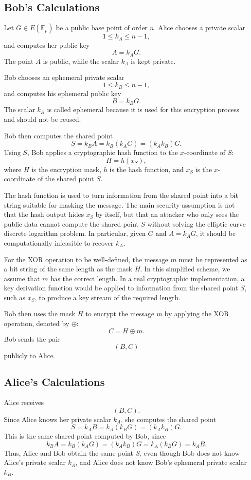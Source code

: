\documentclass[12pt,a4paper]{article}
\begin{document}
\subsection{Bob's Calculations}

Let \(G\in E(\mathbb{F}_p)\) be a public base point of order \(n\). Alice chooses a private scalar
\[1\leq k_A\leq n-1,\]
and computes her public key
\[A=k_AG.\]
The point \(A\) is public, while the scalar \(k_A\) is kept private.

Bob chooses an ephemeral private scalar
\[1\leq k_B\leq n-1,\]
and computes his ephemeral public key
\[B=k_BG.\]
The scalar \(k_B\) is called ephemeral because it is used for this encryption process and should not be reused.

Bob then computes the shared point
\[S=k_BA=k_B(k_AG)=(k_Ak_B)G.\]
Using \(S\), Bob applies a cryptographic hash function to the \(x\)-coordinate of \(S\):
\[H=h(x_S),\]
where \(H\) is the encryption mask, \(h\) is the hash function, and \(x_S\) is the \(x\)-coordinate of the shared point \(S\).

The hash function is used to turn information from the shared point into a bit string suitable for masking the message. The main security assumption is not that the hash output hides \(x_S\) by itself, but that an attacker who only sees the public data cannot compute the shared point \(S\) without solving the elliptic curve discrete logarithm problem. In particular, given \(G\) and \(A=k_AG\), it should be computationally infeasible to recover \(k_A\).

For the XOR operation to be well-defined, the message \(m\) must be represented as a bit string of the same length as the mask \(H\). In this simplified scheme, we assume that \(m\) has the correct length. In a real cryptographic implementation, a key derivation function would be applied to information from the shared point \(S\), such as \(x_S\), to produce a key stream of the required length.

Bob then uses the mask \(H\) to encrypt the message \(m\) by applying the XOR operation, denoted by \(\oplus\):
\[C=H\oplus m.\]
Bob sends the pair
\[(B,C)\]
publicly to Alice.

\subsection{Alice's Calculations}

Alice receives
\[(B,C).\]
Since Alice knows her private scalar \(k_A\), she computes the shared point
\[S=k_AB=k_A(k_BG)=(k_Ak_B)G.\]
This is the same shared point computed by Bob, since
\[k_BA=k_B(k_AG)=(k_Ak_B)G=k_A(k_BG)=k_AB.\]
Thus, Alice and Bob obtain the same point \(S\), even though Bob does not know Alice's private scalar \(k_A\), and Alice does not know Bob's ephemeral private scalar \(k_B\).
\end{document}
